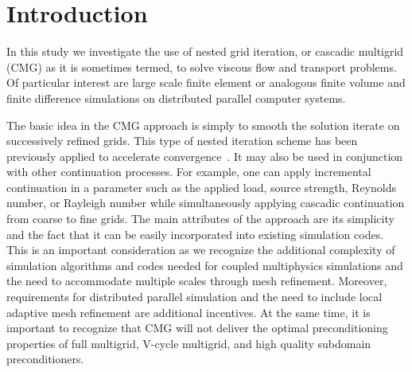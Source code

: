 


\def\p{{\partial}}
\def\cI{{\cal I}}
\def\cP{{\cal P}}
\def\fnorm{{\| f \|_0}}

\def\Frac{\displaystyle \frac}

\def\cA{{\cal A}}
\def\dt{\Delta t}
\def\cA{{\bf {\cal A}}}

\def\bu{\mbox{{\boldmath $u$}}}
\def\bF{\mbox{{\boldmath $f$}}}


\section{Introduction}
In this study we investigate the use of nested grid
iteration, or cascadic multigrid (CMG) as it is sometimes
termed, to solve viscous flow and transport problems.  Of particular
interest are large scale finite element or analogous finite volume
and finite difference simulations on distributed parallel computer
systems.

The basic idea in the CMG approach is simply to smooth the
solution iterate on successively refined grids.  This type of nested
iteration scheme has been previously applied to accelerate
convergence~\cite{CarHum81}. It may also be used in conjunction with
other continuation processes.  For example, one can apply incremental
continuation in a parameter such as the applied load, source strength,
Reynolds number, or Rayleigh number while simultaneously applying
cascadic continuation from coarse to fine grids.  The main attributes
of the approach are its simplicity and the fact that it can be easily
incorporated into existing simulation codes.  This
is an important consideration as we recognize the additional
complexity of simulation algorithms and codes needed for coupled
multiphysics simulations and the need to accommodate multiple scales
through mesh refinement.  Moreover, requirements for distributed
parallel simulation and the need to include local adaptive mesh
refinement are additional incentives.  At the same time, it is
important to recognize that CMG will not deliver the optimal
preconditioning properties of full multigrid, V-cycle multigrid, and
high quality subdomain preconditioners.


